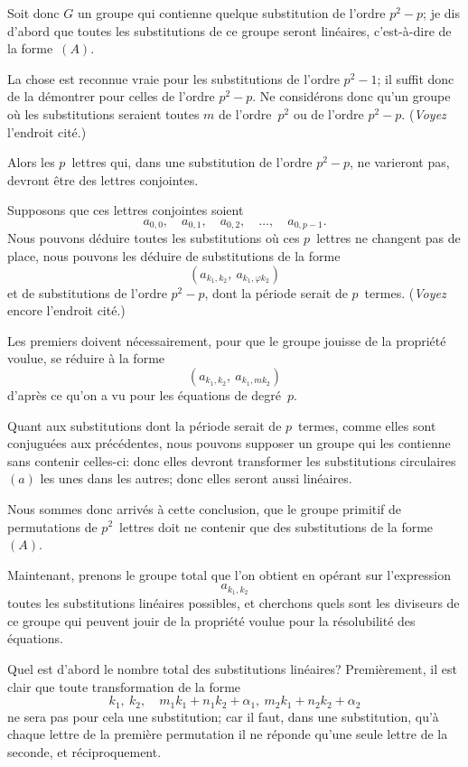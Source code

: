 \documentclass[leqno,12pt]{book}[2005/09/16]
\newcommand{\Eq}[1]{\ensuremath{#1}}
\renewcommand{\phi}{\varphi}
\begin{document}
Soit donc $G$ un groupe qui contienne quelque substitution de
l'ordre $p^{2} - p$; je dis d'abord que toutes les substitutions de ce
groupe seront linéaires, c'est-à-dire de la forme~\Eq{(A)}.

La chose est reconnue vraie pour les substitutions de l'ordre
$p^{2} - 1$; il suffit donc de la démontrer pour celles de l'ordre
$p^{2} - p$. Ne considérons donc qu'un groupe où les substitutions
seraient toutes $m$ de l'ordre~$p^{2}$ ou de l'ordre $p^{2} - p$. (\emph{Voyez} l'endroit
cité.)

Alors les $p$~lettres qui, dans une substitution de l'ordre $p^{2} - p$,
ne varieront pas, devront être des lettres conjointes.

Supposons que ces lettres conjointes soient
\[
a_{0,0},\quad a_{0,1},\quad a_{0,2},\quad \dots, \quad a_{0,p-1}.
\]
Nous pouvons déduire toutes les substitutions où ces $p$~lettres ne
changent pas de place, nous pouvons les déduire de substitutions
de la forme
\[
(a_{k_{1},k_{2}},\ a_{k_{1},\phi k_{2}})
\]
et de substitutions de l'ordre $p^{2} - p$, dont la période serait de $p$~termes.
(\emph{Voyez} encore l'endroit cité.)

Les premiers doivent nécessairement, pour que le groupe
jouisse de la propriété voulue, se réduire à la forme
\[
(a_{k_{1},k_{2}},\ a_{k_{1},m k_{2}})
\]
d'après ce qu'on a vu pour les équations de degré~$p$.

Quant aux substitutions dont la période serait de $p$~termes,
comme elles sont conjuguées aux précédentes, nous pouvons supposer
un groupe qui les contienne sans contenir celles-ci: donc
elles devront transformer les substitutions circulaires~\Eq{(a)} les unes
dans les autres; donc elles seront aussi linéaires.

Nous sommes donc arrivés à cette conclusion, que le groupe
primitif de permutations de $p^{2}$~lettres doit ne contenir que des
substitutions de la forme~\Eq{(A)}.

Maintenant, prenons le groupe total que l'on obtient en opérant
sur l'expression
\[
a_{k_{1},k_{2}}
\]
toutes les substitutions linéaires possibles, et cherchons quels
sont les diviseurs de ce groupe qui peuvent jouir de la propriété
voulue pour la résolubilité des équations.

Quel est d'abord le nombre total des substitutions linéaires?
Premièrement, il est clair que toute transformation de la forme
\[
k_{1},\ k_{2},\quad m_{1}k_{1} + n_{1}k_{2} + \alpha_{1},\ m_{2}k_{1} + n_{2}k_{2} + \alpha_{2}
\]
ne sera pas pour cela une substitution; car il faut, dans une substitution,
qu'à chaque lettre de la première permutation il ne réponde
qu'une seule lettre de la seconde, et réciproquement.
\end{document}
